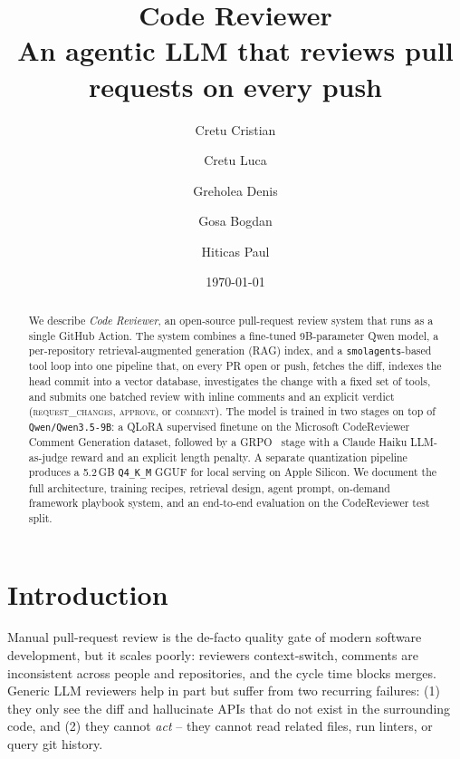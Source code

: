 \documentclass[11pt,a4paper]{article}
\title{\textbf{\sffamily Code Reviewer}\\[2pt]
  \large\sffamily An agentic LLM that reviews pull requests on every push}
\author[1]{Cretu Cristian}
\author[1]{Cretu Luca}
\author[1]{Greholea Denis}
\author[1]{Gosa Bogdan}
\author[1]{Hiticas Paul}
\affil[1]{Team Messi}
\date{\today}
\newcommand{\code}[1]{\texttt{\small #1}}
\begin{document}
\maketitle

\begin{abstract}
\noindent
We describe \emph{Code Reviewer}, an open-source pull-request review system that
runs as a single GitHub Action. The system combines a fine-tuned 9B-parameter
Qwen model, a per-repository retrieval-augmented generation (RAG) index, and a
\code{smolagents}-based tool loop into one pipeline that, on every PR open or
push, fetches the diff, indexes the head commit into a vector database,
investigates the change with a fixed set of tools, and submits one batched
review with inline comments and an explicit verdict
(\textsc{request\_changes}, \textsc{approve}, or \textsc{comment}). The model
is trained in two stages on top of \code{Qwen/Qwen3.5-9B}: a QLoRA supervised
finetune on the Microsoft CodeReviewer Comment Generation dataset, followed by
a GRPO~\cite{shao2024deepseekmath} stage with a Claude Haiku LLM-as-judge
reward and an explicit length penalty. A separate quantization pipeline
produces a 5.2\,GB \code{Q4\_K\_M} GGUF for local serving on Apple Silicon. We
document the full architecture, training recipes, retrieval design, agent
prompt, on-demand framework playbook system, and an end-to-end evaluation on
the CodeReviewer test split.
\end{abstract}

\section{Introduction}

Manual pull-request review is the de-facto quality gate of modern software
development, but it scales poorly: reviewers context-switch, comments are
inconsistent across people and repositories, and the cycle time blocks
merges. Generic LLM reviewers help in part but suffer from two recurring
failures: (1) they only see the diff and hallucinate APIs that do not exist in
the surrounding code, and (2) they cannot \emph{act} -- they cannot read
related files, run linters, or query git history.
\end{document}

